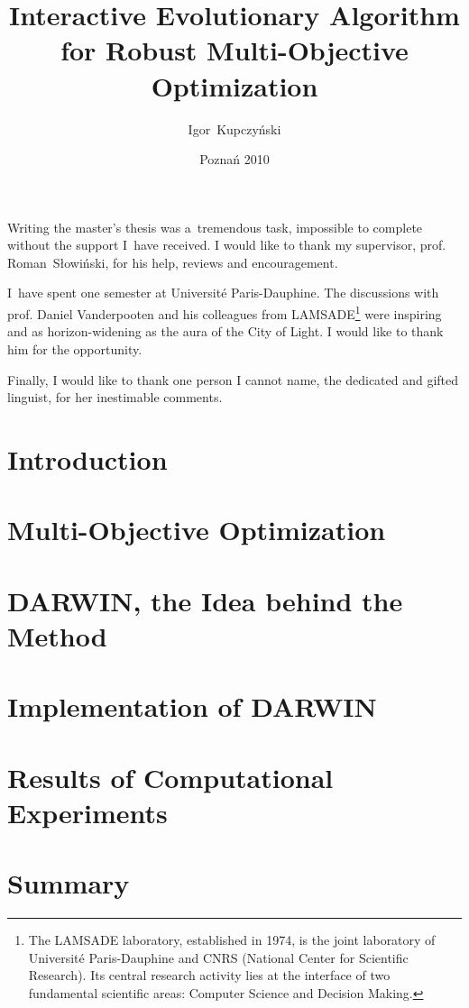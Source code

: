 \documentclass[a4paper,english,thesis]{dcsbook}
\author{Igor~Kupczy\'nski}
\date{Pozna\'n 2010}
\title{Interactive Evolutionary Algorithm \\ for Robust Multi-Objective
  Optimization}
\begin{document}
\maketitle
\frontmatter

\parbox{1cm}{
\vspace{15cm}
}

Writing the master's thesis was a~tremendous task, impossible to complete
without the support I~have received. I would like to thank my supervisor,
prof. Roman~S\l{}owi\'nski, for his help, reviews and encouragement.

I~have spent one semester at Universit\'{e} Paris-Dauphine. The discussions
with prof. Daniel Vanderpooten and his colleagues from LAMSADE\footnote{The
  LAMSADE laboratory, established in 1974, is the joint laboratory of
  Universit\'{e} Paris-Dauphine and CNRS (National Center for Scientific
  Research). Its central research activity lies at the interface of two
  fundamental scientific areas: Computer Science and Decision Making.} were
inspiring and as horizon-widening as the aura of the City of Light. I would
like to thank him for the opportunity.

Finally, I would like to thank one person I cannot name, the dedicated and
gifted linguist, for her inestimable comments.

\tableofcontents{}
\mainmatter

\chapter{Introduction}

\chapter{Multi-Objective Optimization}


\chapter{DARWIN, the Idea behind the Method}
\label{darwin-the-idea}

\chapter{Implementation of DARWIN}
\label{darwin-implementation}


\chapter{Results of Computational Experiments}
\label{exp-results}


\chapter{Summary}


\backmatter



\appendix
\appendixpage
\addappheadtotoc

\end{document}
